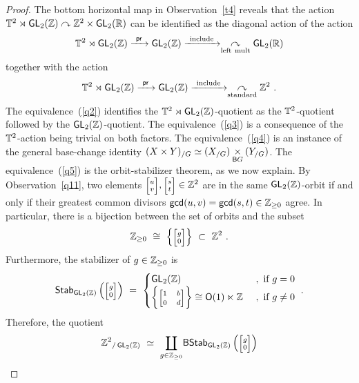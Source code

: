 \begin{proof}
The bottom horizontal map in Observation~\ref{t4} reveals that the action $ \mathbb T^2 \rtimes \operatorname{\sf GL}_2(\mathbb Z) \curvearrowright \mathbb Z^2 \times \operatorname{\sf GL}_2(\mathbb R)$ can be identified as the diagonal action of the action
\[
\mathbb T^2 \rtimes \operatorname{\sf GL}_2(\mathbb Z) \xrightarrow{~\operatorname{\mathsf{pr}}~} \operatorname{\sf GL}_2(\mathbb Z) \xrightarrow{~\rm include~} \underset{\rm left~mult}{\curvearrowright} \operatorname{\sf GL}_2(\mathbb R)
\]
together with the action
\[
\mathbb T^2 \rtimes \operatorname{\sf GL}_2(\mathbb Z) \xrightarrow{~\operatorname{\mathsf{pr}}~} \operatorname{\sf GL}_2(\mathbb Z) \xrightarrow{~\rm include~} \underset{\rm standard}{\curvearrowright} \mathbb Z^2
~.
\]
The equivalence~(\ref{q2}) identifies the $\mathbb T^2 \rtimes \operatorname{\sf GL}_2(\mathbb Z)$-quotient as the $\mathbb T^2$-quotient followed by the $\operatorname{\sf GL}_2(\mathbb Z)$-quotient.
The equivalence~(\ref{q3})  is a consequence of the $\mathbb T^2$-action being trivial on both factors.
The equivalence~(\ref{q4}) is an instance of the general base-change identity $(X\times Y)_{/G} \simeq (X_{/G}) \underset{\mathsf B G}\times (Y_{/G})$.  
The equivalence~(\ref{q5}) is the orbit-stabilizer theorem, as we now explain.
By Observation~\ref{q11}, two elements $\mbox{\scriptsize$\begin{bmatrix} u \\ v \end{bmatrix} $}, \mbox{\scriptsize$\begin{bmatrix} s \\ t \end{bmatrix} $}\in \ZZ^2$ are in the same $\operatorname{\sf GL}_2(\mathbb Z)$-orbit if and only if their greatest common divisors ${\sf gcd}(u,v) = {\sf gcd}(s,t)\in \mathbb Z_{\geq 0}$ agree.
In particular, there is a bijection between the set of orbits and the subset
\[
\ZZ_{\geq 0}
~\cong~
\left\{
\mbox{\scriptsize$\begin{bmatrix} g \\ 0 \end{bmatrix}$} \right\}
~\subset~
\ZZ^2
~.
\]
Furthermore, the stabilizer of $g \in \mathbb Z_{\geq 0}$ is
\[
{\sf Stab}_{\GL_2(\ZZ)}\left(\mbox{\scriptsize$ \begin{bmatrix} g \\ 0 \end{bmatrix}$} \right)
~=~
\begin{cases}
\GL_2(\ZZ)
&
~,
\text{ if }g = 0 
\\
\left\{
\mbox{\scriptsize$\begin{bmatrix}
1 & b
\\
0 & d
\end{bmatrix}$}
\right\}
\cong
\sO(1) \ltimes \ZZ
&
~,
\text{ if }g \neq 0 
\end{cases}
~.
\]
Therefore, the quotient
\[
{
\ZZ^2
}_{/\GL_2(\ZZ)}
~\simeq~
\underset{g\in \ZZ_{\geq 0}}
\coprod
\sB {\sf Stab}_{\GL_2(\ZZ)}\left( \mbox{\scriptsize$\begin{bmatrix} g \\ 0 \end{bmatrix}$} \right)
\]
\end{proof}

